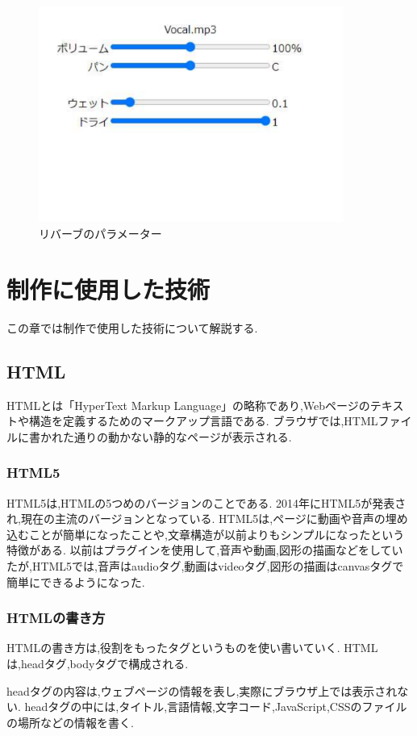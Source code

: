 \documentclass[12pt,a4j,titlepage]{ltjsarticle}
\begin{document}
\begin{figure}[H]
\centering
 \includegraphics[width=100mm]{./figures/reverblayout.pdf}
 \caption{リバーブのパラメーター}
 \label{fig:reverblayout}
\end{figure}

\newpage
\section{制作に使用した技術}
この章では制作で使用した技術について解説する.
\subsection{HTML}
HTMLとは「HyperText Markup Language」の略称であり,Webページのテキストや構造を定義するためのマークアップ言語である\cite{html}.
ブラウザでは,HTMLファイルに書かれた通りの動かない静的なページが表示される.

\subsubsection{HTML5}
HTML5は,HTMLの5つめのバージョンのことである.
2014年にHTML5が発表され,現在の主流のバージョンとなっている.
HTML5は,ページに動画や音声の埋め込むことが簡単になったことや,文章構造が以前よりもシンプルになったという特徴がある\cite{html5}.
以前はプラグインを使用して,音声や動画,図形の描画などをしていたが,HTML5では,音声はaudioタグ,動画はvideoタグ,図形の描画はcanvasタグで簡単にできるようになった.

\subsubsection{HTMLの書き方}
HTMLの書き方は,役割をもったタグというものを使い書いていく.
HTMLは,headタグ,bodyタグで構成される.

headタグの内容は,ウェブページの情報を表し,実際にブラウザ上では表示されない.
headタグの中には,タイトル,言語情報,文字コード,JavaScript,CSSのファイルの場所などの情報を書く.
\end{document}
